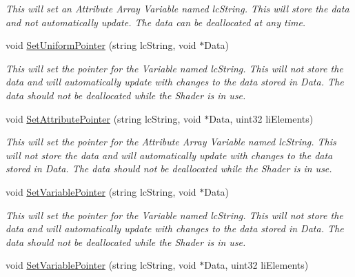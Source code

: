 \begin{DoxyCompactItemize}
\begin{DoxyCompactList}\small\item\em This will set an Attribute Array Variable named lcString. This will store the data and not automatically update. The data can be deallocated at any time. \end{DoxyCompactList}\item 
\hypertarget{classc_render_object_a000b32ac1da318565314489ca596601c}{
void \hyperlink{classc_render_object_a000b32ac1da318565314489ca596601c}{SetUniformPointer} (string lcString, void $\ast$Data)}
\label{classc_render_object_a000b32ac1da318565314489ca596601c}

\begin{DoxyCompactList}\small\item\em This will set the pointer for the Variable named lcString. This will not store the data and will automatically update with changes to the data stored in Data. The data should not be deallocated while the Shader is in use. \end{DoxyCompactList}\item 
\hypertarget{classc_render_object_a3add8b05fc1d7f4d910149a4f86e2877}{
void \hyperlink{classc_render_object_a3add8b05fc1d7f4d910149a4f86e2877}{SetAttributePointer} (string lcString, void $\ast$Data, uint32 liElements)}
\label{classc_render_object_a3add8b05fc1d7f4d910149a4f86e2877}

\begin{DoxyCompactList}\small\item\em This will set the pointer for the Attribute Array Variable named lcString. This will not store the data and will automatically update with changes to the data stored in Data. The data should not be deallocated while the Shader is in use. \end{DoxyCompactList}\item 
\hypertarget{classc_render_object_a5b2c5a5e573530b243e1d1017bac0d80}{
void \hyperlink{classc_render_object_a5b2c5a5e573530b243e1d1017bac0d80}{SetVariablePointer} (string lcString, void $\ast$Data)}
\label{classc_render_object_a5b2c5a5e573530b243e1d1017bac0d80}

\begin{DoxyCompactList}\small\item\em This will set the pointer for the Variable named lcString. This will not store the data and will automatically update with changes to the data stored in Data. The data should not be deallocated while the Shader is in use. \end{DoxyCompactList}\item 
\hypertarget{classc_render_object_a6a5096bbe100657432f3d5d33cc837d3}{
void \hyperlink{classc_render_object_a6a5096bbe100657432f3d5d33cc837d3}{SetVariablePointer} (string lcString, void $\ast$Data, uint32 liElements)}
\label{classc_render_object_a6a5096bbe100657432f3d5d33cc837d3}


\end{DoxyCompactItemize}
